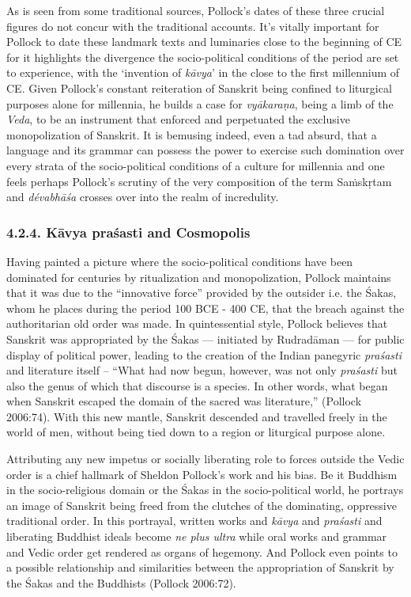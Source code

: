 As is seen from some traditional sources, Pollock’s dates of these three crucial figures do not concur with the traditional accounts. It’s vitally important for Pollock to date these landmark texts and luminaries close to the beginning of CE for it highlights the divergence the socio-political conditions of the period are set to experience, with the ‘invention of \textit{kāvya}’ in the close to the first millennium of CE. Given Pollock’s constant reiteration of Sanskrit being confined to liturgical purposes alone for millennia, he builds a case for \textit{vyākaraṇa}, being a limb of the \textit{Veda}, to be an instrument that enforced and perpetuated the exclusive monopolization of Sanskrit. It is bemusing indeed, even a tad absurd, that a language and its grammar can possess the power to exercise such domination over every strata of the socio-political conditions of a culture for millennia and one feels perhaps Pollock’s scrutiny of the very composition of the term Saṁskṛtam and \textit{dévabhāśa} crosses over into the realm of incredulity.

\vspace{-.3cm}

\subsubsection*{4.2.4. Kāvya praśasti and Cosmopolis}

Having painted a picture where the socio-political conditions have been dominated for centuries by ritualization and monopolization, Pollock maintains that it was due to the “innovative force” provided by the outsider i.e. the Śakas, whom he places during the period 100 BCE - 400 CE, that the breach against the authoritarian old order was made. In quintessential style, Pollock believes that Sanskrit was appropriated by the Śakas — initiated by Rudradāman — for public display of political power, leading to the creation of the Indian panegyric \textit{praśasti} and literature itself – “What had now begun, however, was not only \textit{praśasti} but also the genus of which that discourse is a species. In other words, what began when Sanskrit escaped the domain of the sacred was literature,” (Pollock 2006:74). With this new mantle, Sanskrit descended and travelled freely in the world of men, without being tied down to a region or liturgical purpose alone.

Attributing any new impetus or socially liberating role to forces outside the Vedic order is a chief hallmark of Sheldon Pollock’s work and his bias. Be it Buddhism in the socio-religious domain or the Śakas in the socio-political world, he portrays an image of Sanskrit being freed from the clutches of the dominating, oppressive traditional order. In this portrayal, written works and \textit{kāvya} and \textit{praśasti} and liberating Buddhist ideals become \textit{ne plus ultra} while oral works and grammar and Vedic order get rendered as organs of hegemony. And Pollock even points to a possible relationship and similarities between the appropriation of Sanskrit by the Śakas and the Buddhists (Pollock 2006:72).


